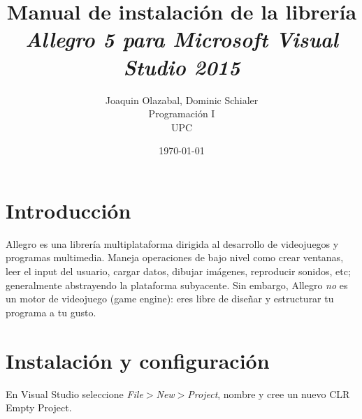 \documentclass[11pt]{article}
\begin{document}
\title{Manual de instalación de la librería \it Allegro 5 \rm para \it Microsoft Visual Studio 2015}
\author{Joaquin Olazabal, Dominic Schialer\\
			Programación I\\
			UPC}
\date{\today}
\maketitle
\vspace{50mm}
\tableofcontents
\pagebreak
\section{Introducción}
Allegro es una librería multiplataforma dirigida al desarrollo de videojuegos y programas multimedia. Maneja operaciones de bajo nivel como crear ventanas, leer el input del usuario, cargar datos, dibujar imágenes, reproducir sonidos, etc; generalmente abstrayendo la plataforma subyacente.  Sin embargo, Allegro \emph{no} es un motor de videojuego (game engine): eres libre de diseñar y estructurar tu programa a tu gusto.

\section{Instalación y configuración}
En Visual Studio seleccione \emph{File$>$New$>$Project}, nombre y cree un nuevo CLR Empty Project.
\end{document}
